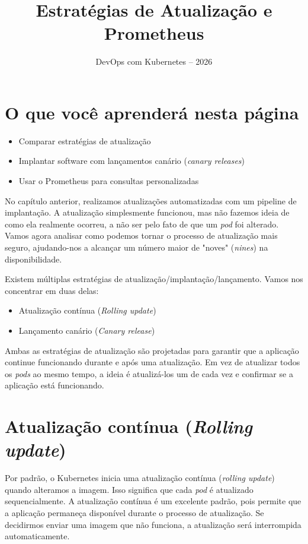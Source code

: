 \documentclass[11pt,a4paper]{article}
\title{\color{secondary}\Huge\textbf{Estratégias de Atualização e Prometheus}}
\author{\color{primary}DevOps com Kubernetes -- 2026}
\date{}
\begin{document}
\maketitle

\section*{\color{primary}O que você aprenderá nesta página}
\begin{itemize}
    \item Comparar estratégias de atualização
    \item Implantar software com lançamentos canário (\textit{canary releases})
    \item Usar o Prometheus para consultas personalizadas
\end{itemize}

No capítulo anterior, realizamos atualizações automatizadas com um pipeline de implantação. A atualização simplesmente funcionou, mas não fazemos ideia de como ela realmente ocorreu, a não ser pelo fato de que um \textit{pod} foi alterado. Vamos agora analisar como podemos tornar o processo de atualização mais seguro, ajudando-nos a alcançar um número maior de "noves" (\textit{nines}) na disponibilidade.

Existem múltiplas estratégias de atualização/implantação/lançamento. Vamos nos concentrar em duas delas:
\begin{itemize}
    \item Atualização contínua (\textit{Rolling update})
    \item Lançamento canário (\textit{Canary release})
\end{itemize}

Ambas as estratégias de atualização são projetadas para garantir que a aplicação continue funcionando durante e após uma atualização. Em vez de atualizar todos os \textit{pods} ao mesmo tempo, a ideia é atualizá-los um de cada vez e confirmar se a aplicação está funcionando.

\section*{\color{primary}Atualização contínua (\textit{Rolling update})}

Por padrão, o Kubernetes inicia uma atualização contínua (\textit{rolling update}) quando alteramos a imagem. Isso significa que cada \textit{pod} é atualizado sequencialmente. A atualização contínua é um excelente padrão, pois permite que a aplicação permaneça disponível durante o processo de atualização. Se decidirmos enviar uma imagem que não funciona, a atualização será interrompida automaticamente.
\end{document}
